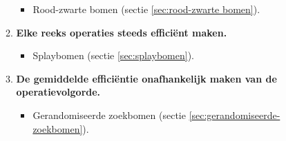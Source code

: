 \begin{itemize}
\begin{enumerate}
\begin{itemize}
            \item Rood-zwarte bomen (sectie \ref{sec:rood-zwarte bomen}).
        \end{itemize}

        \item \textbf{Elke reeks operaties steeds efficiënt maken.}
        \begin{itemize}
            \item Splaybomen (sectie \ref{sec:splaybomen}).
        \end{itemize}

        \item \textbf{De gemiddelde efficiëntie onafhankelijk maken van de operatievolgorde.}
        \begin{itemize}
            \item Gerandomiseerde zoekbomen (sectie \ref{sec:gerandomiseerde-zoekbomen}).

        \end{itemize}
    \end{enumerate}
\end{itemize}

